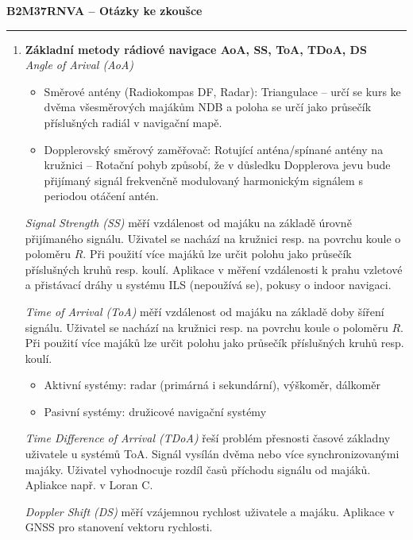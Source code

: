 \documentclass[11pt,a4paper]{article}
\begin{document}

\noindent\LARGE\textbf{B2M37RNVA -- Otázky ke zkoušce}\normalsize\\
\noindent\rule{12.5cm}{0.4pt}

\begin{enumerate}
    \item \textbf{Základní metody rádiové navigace AoA, SS, ToA, TDoA, DS}\\
    \emph{Angle of Arival (AoA)}
    \begin{itemize}
        \item Směrové antény (Radiokompas DF, Radar): Triangulace -- určí se kurs ke dvěma všesměrových majákům NDB a poloha se určí jako průsečík příslušných radiál v navigační mapě.
        \item Dopplerovský směrový zaměřovač: Rotující anténa/spínané antény na kružnici -- Rotační pohyb způsobí, že v důsledku Dopplerova jevu bude přijímaný signál frekvenčně modulovaný harmonickým signálem s periodou otáčení antén.
    \end{itemize}

    \emph{Signal Strength (SS)} měří vzdálenost od majáku na základě úrovně přijímaného signálu. Uživatel se nachází na kružnici resp. na povrchu koule o poloměru $R$. Při použití více majáků lze určit polohu jako průsečík příslušných kruhů resp. koulí. Aplikace v měření vzdálenosti k prahu vzletové a přistávací dráhy u systému ILS (nepoužívá se), pokusy o indoor navigaci.

    \emph{Time of Arrival (ToA)} měří vzdálenost od majáku na základě doby šíření signálu. Uživatel se nachází na kružnici resp. na povrchu koule o poloměru $R$. Při použití více majáků lze určit polohu jako průsečík příslušných kruhů resp. koulí.
    \begin{itemize}
        \item Aktivní systémy: radar (primárná i sekundární), výškoměr, dálkoměr
        \item Pasivní systémy: družicové navigační systémy
    \end{itemize}

    \emph{Time Difference of Arrival (TDoA)} řeší problém přesnosti časové základny uživatele u systémů ToA. Signál vysílán dvěma nebo více synchronizovanými majáky. Uživatel vyhodnocuje rozdíl časů příchodu signálu od majáků. Apliakce např. v Loran C.

    \emph{Doppler Shift (DS)} měří vzájemnou rychlost uživatele a majáku. Aplikace v GNSS pro stanovení vektoru rychlosti.
    

\end{enumerate}
\end{document}
